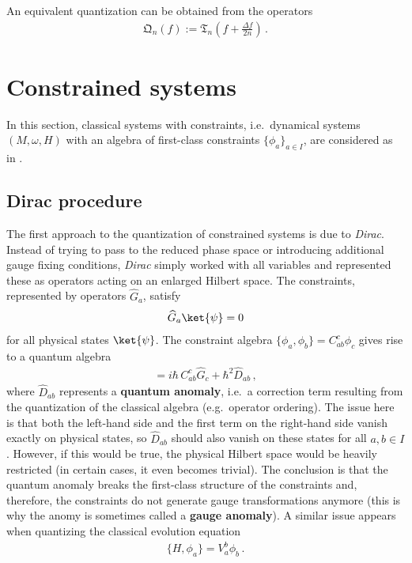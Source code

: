     \begin{remark}
        An equivalent quantization can be obtained from the operators
        \begin{gather}
            \mathfrak{Q}_n(f) := \mathfrak{T}_n\left(f + \frac{\Delta f}{2n}\right)\,.
        \end{gather}
    \end{remark}


\section{Constrained systems}\label{section:quantum_constrained}

    In this section, classical systems with constraints, i.e.~dynamical systems $(M,\omega,H)$ with an algebra of first-class constraints $\{\phi_a\}_{a\in I}$, are considered as in .

\subsection{Dirac procedure}

    The first approach to the quantization of constrained systems is due to \textit{Dirac}. Instead of trying to pass to the reduced phase space or introducing additional gauge fixing conditions, \textit{Dirac} simply worked with all variables and represented these as operators acting on an enlarged Hilbert space. The constraints, represented by operators $\widehat{G}_a$, satisfy
    \begin{gather}
        \widehat{G}_a\ket{\psi}=0
    \end{gather}
    for all physical states $\ket{\psi}$. The constraint algebra $\{\phi_a,\phi_b\} = C^c_{ab}\phi_c$ gives rise to a quantum algebra
    \begin{gather}
        [\widehat{G}_a,\widehat{G}_b] = i\hbar\,C^c_{ab}\widehat{G}_c + \hbar^2\widehat{D}_{ab}\,,
    \end{gather}
    where $\widehat{D}_{ab}$ represents a \textbf{quantum anomaly}, i.e.~a correction term resulting from the quantization of the classical algebra (e.g.~operator ordering). The issue here is that both the left-hand side and the first term on the right-hand side vanish exactly on physical states, so $\widehat{D}_{ab}$ should also vanish on these states for all $a,b\in I$. However, if this would be true, the physical Hilbert space would be heavily restricted (in certain cases, it even becomes trivial). The conclusion is that the quantum anomaly breaks the first-class structure of the constraints and, therefore, the constraints do not generate gauge transformations anymore (this is why the anomy is sometimes called a \textbf{gauge anomaly}). A similar issue appears when quantizing the classical evolution equation
    \begin{gather}
        \{H,\phi_a\} = V_a^b\phi_b\,.
    \end{gather}

